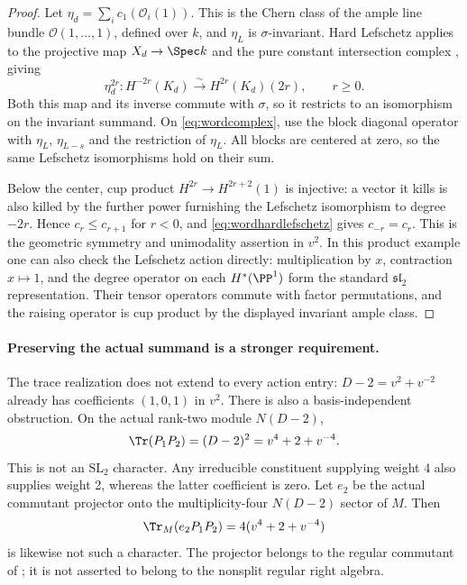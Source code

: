 \begin{proof}
Let $\eta_d=\sum_i c_1(\mathcal O_i(1))$.
This is the Chern class of the ample line bundle
$\mathcal O(1,\ldots,1)$, defined over $k$, and $\eta_L$ is
$\sigma$-invariant. Hard Lefschetz applies to the projective
map $X_d\to\Spec k$ and the pure constant intersection complex
\cite[Theorem~5.4.10, p.~144]{BBD}, giving
\begin{equation}\label{eq:wordhardlefschetz}
 \eta_d^{2r}:H^{-2r}(K_d)
          \xrightarrow{\sim} H^{2r}(K_d)(2r),\qquad r\ge0.
\end{equation}
Both this map and its inverse commute with $\sigma$, so it
restricts to an isomorphism on the invariant summand. On
\eqref{eq:wordcomplex}, use the block diagonal operator with
$\eta_L$, $\eta_{L-s}$ and the restriction of $\eta_L$.
All blocks are centered at zero, so the same Lefschetz
isomorphisms hold on their sum.

Below the center, cup product
$H^{2r}\to H^{2r+2}(1)$ is injective: a vector it kills is
also killed by the further power furnishing the Lefschetz
isomorphism to degree $-2r$. Hence $c_r\le c_{r+1}$ for $r<0$,
and \eqref{eq:wordhardlefschetz} gives $c_{-r}=c_r$.
This is the geometric symmetry and unimodality assertion in $v^2$.
In this product example one can also check the Lefschetz action
directly: multiplication by $x$, contraction $x\mapsto1$, and
the degree operator on each $H^*(\PP^1)$ form the standard
$\mathfrak{sl}_2$ representation. Their tensor operators commute
with factor permutations, and the raising operator is cup product
by the displayed invariant ample class.
\end{proof}

\paragraph{Preserving the actual summand is a stronger requirement.}
The trace realization does not extend to every action entry:
$D-2=v^2+v^{-2}$ already has coefficients $(1,0,1)$ in $v^2$.
There is also a basis-independent obstruction. On the actual
rank-two module $N(D-2)$,
\[
 \Tr(P_1P_2)=(D-2)^2=v^4+2+v^{-4}.
\]
This is not an $\mathrm{SL}_2$ character. Any irreducible
constituent supplying weight 4 also supplies weight 2, whereas
the latter coefficient is zero.
Let $e_2$ be the actual commutant projector onto the
multiplicity-four $N(D-2)$ sector of $M$. Then
\[
 \Tr_M(e_2P_1P_2)=4(v^4+2+v^{-4})
\]
is likewise not such a character. The projector belongs to the
regular commutant of ; it is not asserted to belong to
the nonsplit regular right algebra.

